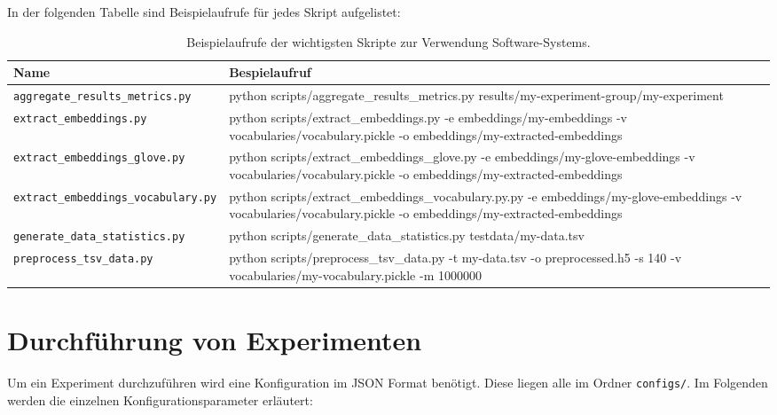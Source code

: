 In der folgenden Tabelle sind Beispielaufrufe für jedes Skript aufgelistet:

\begin{table}[H]
	\centering
	\begin{adjustbox}{max width=\textwidth}
		\begin{tabular}{lp{20cm}}
			\toprule
			Name & Bespielaufruf\\ \midrule
			\texttt{aggregate{\_}results{\_}metrics.py} & python scripts/aggregate{\_}results{\_}metrics.py results/my-experiment-group/my-experiment\\
			\texttt{extract{\_}embeddings.py} & python scripts/extract{\_}embeddings.py -e embeddings/my-embeddings -v vocabularies/vocabulary.pickle -o embeddings/my-extracted-embeddings\\
			\texttt{extract{\_}embeddings{\_}glove.py} & python scripts/extract{\_}embeddings{\_}glove.py -e embeddings/my-glove-embeddings -v vocabularies/vocabulary.pickle -o embeddings/my-extracted-embeddings\\
			\texttt{extract{\_}embeddings{\_}vocabulary.py} & python scripts/extract{\_}embeddings{\_}vocabulary.py.py -e embeddings/my-glove-embeddings -v vocabularies/vocabulary.pickle -o embeddings/my-extracted-embeddings\\
			\texttt{generate{\_}data{\_}statistics.py} & python scripts/generate{\_}data{\_}statistics.py testdata/my-data.tsv\\
			\texttt{preprocess{\_}tsv{\_}data.py} & python scripts/preprocess{\_}tsv{\_}data.py -t my-data.tsv -o preprocessed.h5 -s 140 -v vocabularies/my-vocabulary.pickle -m 1000000\\
			\bottomrule
		\end{tabular}
	\end{adjustbox}
	\caption{Beispielaufrufe der wichtigsten Skripte zur Verwendung Software-Systems.}
\end{table}

\clearpage

\section{Durchführung von Experimenten}
Um ein Experiment durchzuführen wird eine Konfiguration im JSON Format benötigt. Diese liegen alle im Ordner \texttt{configs/}. Im Folgenden werden die einzelnen Konfigurationsparameter erläutert:

